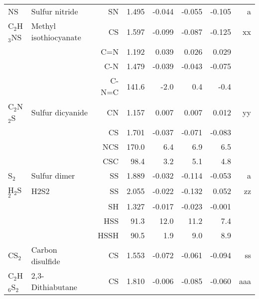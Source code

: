 \begin{table}
\begin{center}
\begin{tabular}{llrrrrrr}
 NS          & Sulfur nitride                     &SN            &     1.495   &    -0.044 &    -0.055 &    -0.105 &     a \\
 C$_2$H$_3$NS      & Methyl isothiocyanate              &CS            &     1.597   &    -0.099 &    -0.087 &    -0.125 &    xx \\
             &                                    &C=N           &     1.192   &     0.039 &     0.026 &     0.029 &       \\
             &                                    &C-N           &     1.479   &    -0.039 &    -0.043 &    -0.075 &       \\
             &                                    &C-N=C       &     141.6   &      -2.0 &       0.4 &      -0.4   &       \\
 C$_2$N$_2$S       & Sulfur dicyanide                   &CN            &     1.157   &     0.007 &     0.007 &     0.012 &    yy \\
             &                                    &CS            &     1.701   &    -0.037 &    -0.071 &    -0.083 &       \\
             &                                    &NCS         &     170.0   &       6.4 &       6.9 &       6.5   &       \\
             &                                    &CSC         &      98.4   &       3.2 &       5.1 &       4.8   &       \\
 S$_2$          & Sulfur dimer                       &SS            &     1.889   &    -0.032 &    -0.114 &    -0.053 &     a \\
 H$_2$S$_2$        & H2S2                               &SS            &     2.055   &    -0.022 &    -0.132 &     0.052 &    zz \\
             &                                    &SH            &     1.327   &    -0.017 &    -0.023 &    -0.001 &       \\
             &                                    &HSS         &      91.3   &      12.0 &      11.2 &       7.4   &       \\
             &                                    &HSSH        &      90.5   &       1.9 &       9.0 &       8.9   &       \\
 CS$_2$         & Carbon disulfide                   &CS            &     1.553   &    -0.072 &    -0.061 &    -0.094 &    ss \\
 C$_2$H$_6$S$_2$      & 2,3-Dithiabutane                   &CS            &     1.810   &    -0.006 &    -0.085 &    -0.060 &   aaa \\

\end{tabular}
\end{center}
\end{table}

